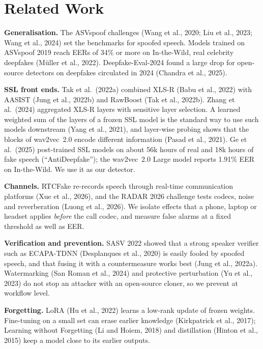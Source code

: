 \documentclass[10pt,a4paper,twocolumn]{article}
\begin{document}
\section{Related Work}
\textbf{Generalisation.} The ASVspoof challenges (Wang et al., 2020; Liu et al., 2023; Wang et al., 2024) set the benchmarks for spoofed speech. Models trained on ASVspoof 2019 reach EERs of 34\% or more on In-the-Wild, real celebrity deepfakes (M\"uller et al., 2022). Deepfake-Eval-2024 found a large drop for open-source detectors on deepfakes circulated in 2024 (Chandra et al., 2025).

\textbf{SSL front ends.} Tak et al.\ (2022a) combined XLS-R (Babu et al., 2022) with AASIST (Jung et al., 2022b) and RawBoost (Tak et al., 2022b). Zhang et al.\ (2024) aggregated XLS-R layers with sensitive layer selection. A learned weighted sum of the layers of a frozen SSL model is the standard way to use such models downstream (Yang et al., 2021), and layer-wise probing shows that the blocks of wav2vec~2.0 encode different information (Pasad et al., 2021). Ge et al.\ (2025) post-trained SSL models on about 56k hours of real and 18k hours of fake speech (``AntiDeepfake''); the wav2vec~2.0 Large model reports 1.91\% EER on In-the-Wild. We use it as our detector.

\textbf{Channels.} RTCFake re-records speech through real-time communication platforms (Xue et al., 2026), and the RADAR 2026 challenge tests codecs, noise and reverberation (Luong et al., 2026). We isolate effects that a phone, laptop or headset applies \emph{before} the call codec, and measure false alarms at a fixed threshold as well as EER.

\textbf{Verification and prevention.} SASV 2022 showed that a strong speaker verifier such as ECAPA-TDNN (Desplanques et al., 2020) is easily fooled by spoofed speech, and that fusing it with a countermeasure works best (Jung et al., 2022a). Watermarking (San Roman et al., 2024) and protective perturbation (Yu et al., 2023) do not stop an attacker with an open-source cloner, so we prevent at workflow level.

\textbf{Forgetting.} LoRA (Hu et al., 2022) learns a low-rank update of frozen weights. Fine-tuning on a small set can erase earlier knowledge (Kirkpatrick et al., 2017); Learning without Forgetting (Li and Hoiem, 2018) and distillation (Hinton et al., 2015) keep a model close to its earlier outputs.

\end{document}
